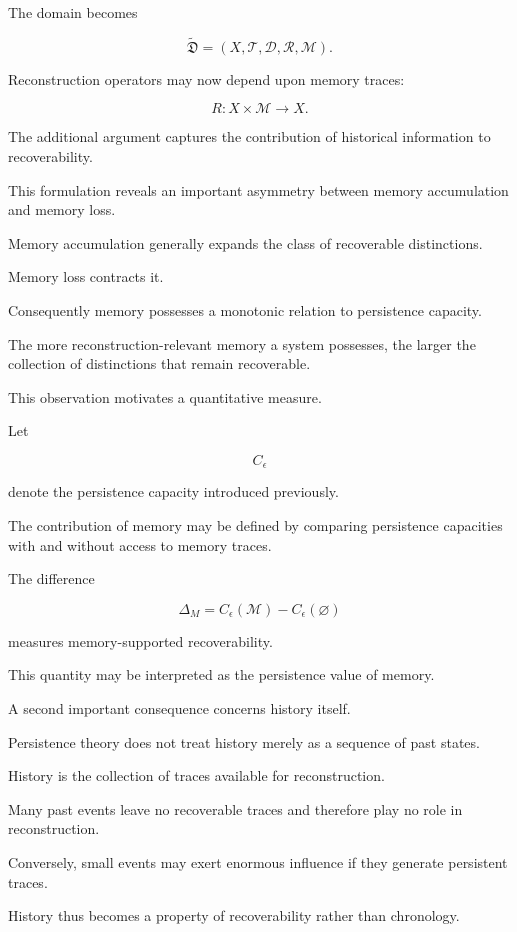 \documentclass[12pt,oneside]{article}
\theoremstyle{definition}
\begin{document}
The domain becomes

\[
\widetilde{\mathfrak D}
=
(X,\mathcal T,\mathcal D,\mathcal R,\mathcal M).
\]

Reconstruction operators may now depend upon memory traces:

\[
R :
X\times\mathcal M
\rightarrow
X.
\]

The additional argument captures the contribution of historical information to recoverability.

This formulation reveals an important asymmetry between memory accumulation and memory loss.

Memory accumulation generally expands the class of recoverable distinctions.

Memory loss contracts it.

Consequently memory possesses a monotonic relation to persistence capacity.

The more reconstruction-relevant memory a system possesses, the larger the collection of distinctions that remain recoverable.

This observation motivates a quantitative measure.

Let

\[
C_\epsilon
\]

denote the persistence capacity introduced previously.

The contribution of memory may be defined by comparing persistence capacities with and without access to memory traces.

The difference

\[
\Delta_M
=
C_\epsilon(\mathcal M)
-
C_\epsilon(\varnothing)
\]

measures memory-supported recoverability.

This quantity may be interpreted as the persistence value of memory.

A second important consequence concerns history itself.

Persistence theory does not treat history merely as a sequence of past states.

History is the collection of traces available for reconstruction.

Many past events leave no recoverable traces and therefore play no role in reconstruction.

Conversely, small events may exert enormous influence if they generate persistent traces.

History thus becomes a property of recoverability rather than chronology.
\end{document}
